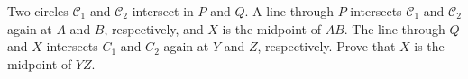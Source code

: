Two circles $\mathcal{C}_1$ and $\mathcal{C}_2$ intersect in $P$ and $Q$. A line through $P$ intersects $\mathcal{C}_1$ and $\mathcal{C}_2$ again at $A$ and $B$,  respectively, and $X$ is the midpoint of $AB$. The line through $Q$ and $X$ intersects $C_1$ and $C_2$ again at $Y$ and $Z$,  respectively. Prove that $X$ is the midpoint of $YZ$.